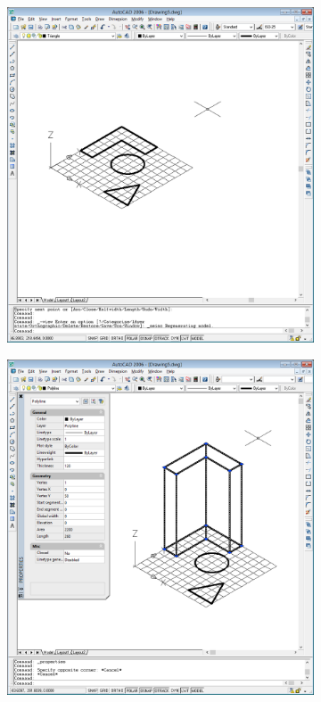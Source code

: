 \documentclass[
	a4paper,
	oneside,
	BCOR = 10mm,
	DIV = 12,
	12pt,
	headings = normal,
]{scrartcl}
\newlength{\gridunitwidth}
\begin{document}
			\begin{figure}[!htbp]
				\begin{subfigure}[b]{4 \gridunitwidth}
					\includegraphics[width = \columnwidth]{./assets/p07.png}
					\caption{}
					\label{subfig:03-figures-3d-iso-se}
				\end{subfigure}%
				\hspace{2 \gridunitwidth}%
				\begin{subfigure}[b]{4 \gridunitwidth}
					\centering
					\includegraphics[width = \columnwidth]{./assets/p08.png}

\end{subfigure}
\end{figure}
\end{document}
